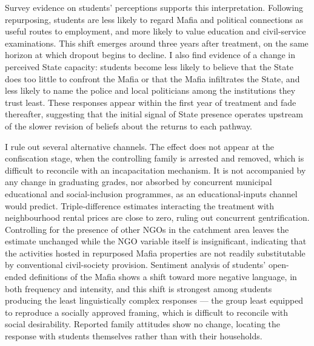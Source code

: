 \documentclass[12pt]{article}
\theoremstyle{plain}
\theoremstyle{plain}
\theoremstyle{plain}
\theoremstyle{definition}
\theoremstyle{plain}
\theoremstyle{definition}
\theoremstyle{plain}
\theoremstyle{remark}
\theoremstyle{definition}
\theoremstyle{definition}
\theoremstyle{plain}
\begin{document}
Survey evidence on students' perceptions supports this interpretation. Following repurposing, students are less likely to regard Mafia and political connections as useful routes to employment, and more likely to value education and civil-service examinations. This shift emerges around three years after treatment, on the same horizon at which dropout begins to decline. I also find evidence of a change in perceived State capacity: students become less likely to believe that the State does too little to confront the Mafia or that the Mafia infiltrates the State, and less likely to name the police and local politicians among the institutions they trust least. These responses appear within the first year of treatment and fade thereafter, suggesting that the initial signal of State presence operates upstream of the slower revision of beliefs about the returns to each pathway.

I rule out several alternative channels. The effect does not appear at the confiscation stage, when the controlling family is arrested and removed, which is difficult to reconcile with an incapacitation mechanism. It is not accompanied by any change in graduating grades, nor absorbed by concurrent municipal educational and social-inclusion programmes, as an educational-inputs channel would predict. Triple-difference estimates interacting the treatment with neighbourhood rental prices are close to zero, ruling out concurrent gentrification. Controlling for the presence of other NGOs in the catchment area leaves the estimate unchanged while the NGO variable itself is insignificant, indicating that the activities hosted in repurposed Mafia properties are not readily substitutable by conventional civil-society provision. Sentiment analysis of students' open-ended definitions of the Mafia shows a shift toward more negative language, in both frequency and intensity, and this shift is strongest among students producing the least linguistically complex responses — the group least equipped to reproduce a socially approved framing, which is difficult to reconcile with social desirability. Reported family attitudes show no change, locating the response with students themselves rather than with their households.
\end{document}
